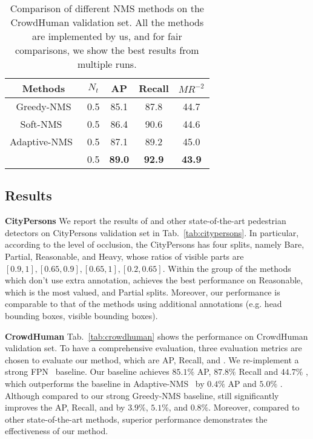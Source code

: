 \documentclass[sigconf]{acmart}
\begin{document}
 


\begin{table}[t]
\begin{center}
\begin{tabular}{ccccc}
\hline
Methods & $N_t$  & AP & Recall & $MR^{-2}$ \\
\hline
Greedy-NMS & 0.5 & 85.1 & 87.8 & 44.7\\
Soft-NMS~\cite{soft-nms} & 0.5 & 86.4 & 90.6 & 44.6 \\
Adaptive-NMS~\cite{adaptive-nms} & 0.5 & 87.1 & 89.2 & 45.0\\
\nmsname{} & 0.5 & \textbf{89.0} & \textbf{92.9} & \textbf{43.9}\\

\end{tabular}
\end{center}
\caption{Comparison of different NMS methods on the CrowdHuman validation set. {\normalfont All the methods are implemented by us, and for fair comparisons, we show the best results from multiple runs.}}
\vspace{-0.5cm}
\label{tab:ablation_nms}
\end{table}
 
\subsection{Results}
\label{sec:results}

\textbf{CityPersons} We report the results of \nmsname{} and other state-of-the-art pedestrian detectors on CityPersons validation set in Tab.~\ref{tab:citypersons}. In particular, according to the level of occlusion, the CityPersons has four splits, namely Bare, Partial, Reasonable, and Heavy, whose ratios of visible parts are $[0.9, 1], [0.65, 0.9], [0.65, 1], [0.2, 0.65]$. Within the group of the methods which don't use extra annotation, \nmsname{} achieves the best performance on Reasonable, which is the most valued, and Partial splits. Moreover, our performance is comparable to that of the methods using additional annotations (e.g. head bounding boxes, visible bounding boxes).

\textbf{CrowdHuman} 
Tab.~\ref{tab:crowdhuman} shows the performance on CrowdHuman validation set. To have a comprehensive evaluation, three evaluation metrics are chosen to evaluate our method, which are AP, Recall, and \mr{}. We re-implement a strong FPN~\cite{fpn} baseline. Our baseline achieves $85.1\%$ AP, $87.8\%$ Recall and $44.7\%$ \mr{}, which outperforms the baseline in Adaptive-NMS~\cite{adaptive-nms} by $0.4\%$ AP and $5.0 \%$ \mr{}. Although compared to our strong Greedy-NMS baseline, \nmsname{} still significantly improves the AP, Recall, and \mr{} by $3.9\%$, $5.1\%$, and $0.8\%$. Moreover, compared to other state-of-the-art methods, superior performance demonstrates the effectiveness of our method.
\end{document}
